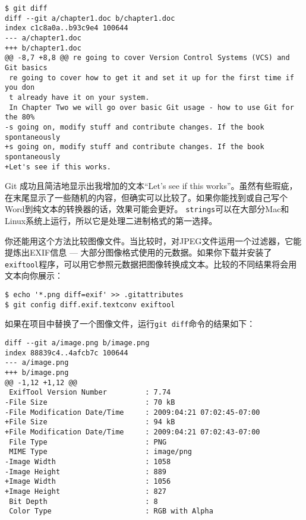 \documentclass[a4paper]{book}
\begin{document}
\begin{shaded}\begin{verbatim}
$ git diff
diff --git a/chapter1.doc b/chapter1.doc
index c1c8a0a..b93c9e4 100644
--- a/chapter1.doc
+++ b/chapter1.doc
@@ -8,7 +8,8 @@ re going to cover Version Control Systems (VCS) and Git basics
 re going to cover how to get it and set it up for the first time if you don
 t already have it on your system.
 In Chapter Two we will go over basic Git usage - how to use Git for the 80%
-s going on, modify stuff and contribute changes. If the book spontaneously
+s going on, modify stuff and contribute changes. If the book spontaneously
+Let's see if this works.
\end{verbatim}\end{shaded}

Git 成功且简洁地显示出我增加的文本“Let's see if this works”。虽然有些瑕疵，在末尾显示了一些随机的内容，但确实可以比较了。如果你能找到或自己写个Word到纯文本的转换器的话，效果可能会更好。 \texttt{strings}可以在大部分Mac和Linux系统上运行，所以它是处理二进制格式的第一选择。

你还能用这个方法比较图像文件。当比较时，对JPEG文件运用一个过滤器，它能提炼出EXIF信息 --- 大部分图像格式使用的元数据。如果你下载并安装了\texttt{exiftool}程序，可以用它参照元数据把图像转换成文本。比较的不同结果将会用文本向你展示：

\begin{shaded}\begin{verbatim}
$ echo '*.png diff=exif' >> .gitattributes
$ git config diff.exif.textconv exiftool
\end{verbatim}\end{shaded}

如果在项目中替换了一个图像文件，运行\texttt{git diff}命令的结果如下：

\begin{shaded}\begin{verbatim}
diff --git a/image.png b/image.png
index 88839c4..4afcb7c 100644
--- a/image.png
+++ b/image.png
@@ -1,12 +1,12 @@
 ExifTool Version Number         : 7.74
-File Size                       : 70 kB
-File Modification Date/Time     : 2009:04:21 07:02:45-07:00
+File Size                       : 94 kB
+File Modification Date/Time     : 2009:04:21 07:02:43-07:00
 File Type                       : PNG
 MIME Type                       : image/png
-Image Width                     : 1058
-Image Height                    : 889
+Image Width                     : 1056
+Image Height                    : 827
 Bit Depth                       : 8
 Color Type                      : RGB with Alpha
\end{verbatim}\end{shaded}
\end{document}
